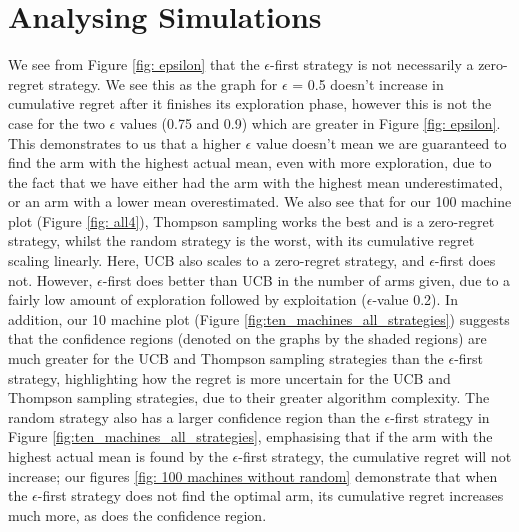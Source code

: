 \section{Analysing Simulations}\label{sec:analysing-simulations}
We see from Figure \ref{fig: epsilon} that the $\epsilon$-first strategy is not necessarily a zero-regret strategy.
We see this as the graph for $\epsilon$ = 0.5 doesn't increase in cumulative regret after it finishes its exploration phase, however this is not the case for the two $\epsilon$ values (0.75 and 0.9) which are greater in Figure \ref{fig: epsilon}.
This demonstrates to us that a higher $\epsilon$ value doesn't mean we are guaranteed to find the arm with the highest actual mean, even with more exploration, due to the fact that we have either had the arm with the highest mean underestimated, or an arm with a lower mean overestimated.
\newline
We also see that for our 100 machine plot (Figure \ref{fig: all4}), Thompson sampling works the best and is a zero-regret strategy, whilst the random strategy is the worst, with its cumulative regret scaling linearly.
Here, UCB also scales to a zero-regret strategy, and $\epsilon$-first does not.
However, $\epsilon$-first does better than UCB in the number of arms given, due to a fairly low amount of exploration followed by exploitation ($\epsilon$-value 0.2).
\newline
In addition, our 10 machine plot (Figure \ref{fig:ten_machines_all_strategies}) suggests that the confidence regions (denoted on the graphs by the shaded regions) are much greater for the UCB and Thompson sampling strategies than the $\epsilon$-first strategy, highlighting how the regret is more uncertain for the UCB and Thompson sampling strategies, due to their greater algorithm complexity.
The random strategy also has a larger confidence region than the $\epsilon$-first strategy in Figure \ref{fig:ten_machines_all_strategies}, emphasising that if the arm with the highest actual mean is found by the $\epsilon$-first strategy, the cumulative regret will not increase;
our figures \ref{fig: 100 machines without random} demonstrate that when the $\epsilon$-first strategy does not find the optimal arm, its cumulative regret increases much more, as does the confidence region.